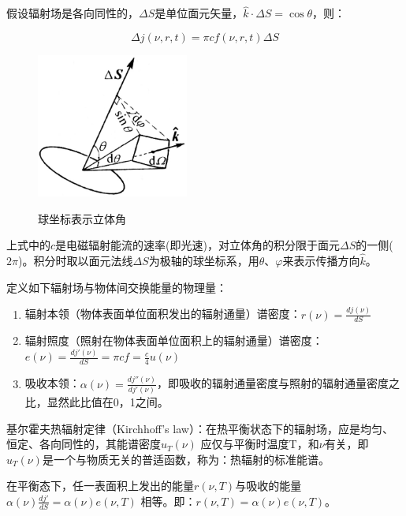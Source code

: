 假设辐射场是各向同性的，$\Delta S$是单位面元矢量，$\hat k \cdot
\Delta S = \cos \theta $，则：

\begin{equation}
\Delta j(\nu ,r,t) = \pi cf(\nu,r,t)\Delta S
\end{equation}

\begin{figure}[h]
\begin{center}
  \includegraphics[width=5cm]{Duality/2-1.ps}\\
  \caption{球坐标表示立体角}\label{2-1}
\end{center}
\end{figure}

上式中的$c$是电磁辐射能流的速率(即光速)，对立体角的积分限于面元$\Delta S$的一侧($2\pi$)。积分时取以面元法线$\Delta S$为极轴的球坐标系，用$\theta$、$\varphi$来表示传播方向$\hat k$。


定义如下辐射场与物体间交换能量的物理量：
\begin{enumerate}
    \item 辐射本领（物体表面单位面积发出的辐射通量）谱密度：$r(\nu ) = \frac{{dj(\nu )}}{{dS}}$
    \item 辐射照度（照射在物体表面单位面积上的辐射通量）谱密度：$e(\nu ) = \frac{{dj'(\nu )}}{{dS}} = \pi cf = \frac{c}{4}u(\nu )$
    \item 吸收本领：$\alpha (\nu ) = \frac{{dj''(\nu )}}{{dj'(\nu )}}$，即吸收的辐射通量密度与照射的辐射通量密度之比，显然此比值在0，1之间。
\end{enumerate}


基尔霍夫热辐射定律（Kirchhoff's
law）：在热平衡状态下的辐射场，应是均匀、恒定、各向同性的，其能谱密度$u_T
(\nu )$ 应仅与平衡时温度T，和$\nu $有关，即$u_T (\nu
)$是一个与物质无关的普适函数，称为：热辐射的标准能谱。

在平衡态下，任一表面积上发出的能量$r(\nu ,T)$与吸收的能量$\alpha (\nu )\frac{{dj'}}{{dS}} = \alpha (\nu )e(\nu ,T)$
相等。即：$r(\nu ,T) = \alpha (\nu )e(\nu ,T)$。

